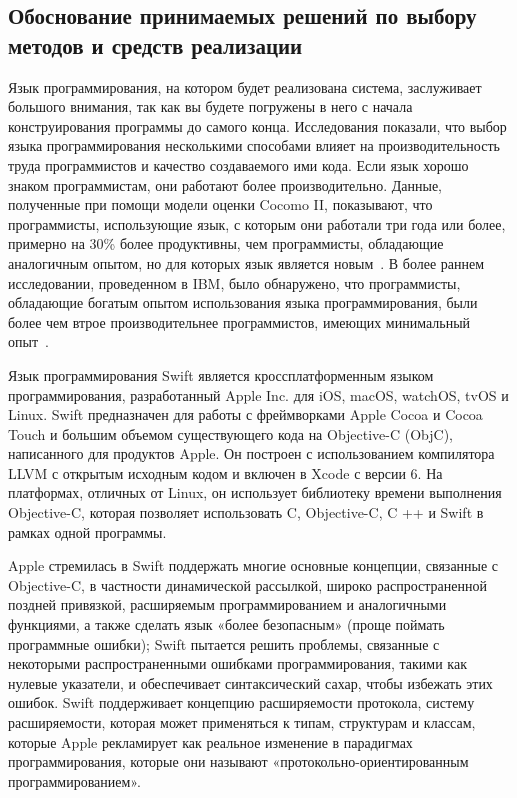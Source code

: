 \newpage
\subsection{Обоснование принимаемых решений по выбору методов и средств реализации}
\label{sec:analysis:functionalModel}

Язык программирования, на котором будет реализована система, заслуживает большого внимания, так как вы будете погружены в него с начала конструирования программы до самого конца. Исследования показали, что выбор языка программирования несколькими способами влияет на производительность труда программистов и качество создаваемого ими кода. Если язык хорошо знаком программистам, они работают более производительно. Данные, полученные при помощи модели оценки Cocomo II, показывают, что программисты, использующие язык, с которым они работали три года или более, примерно на 30\% более продуктивны, чем программисты, обладающие аналогичным опытом, но для которых язык является новым~\cite{software_cost_estimation}. В более раннем исследовании, проведенном в IBM, было обнаружено, что программисты, обладающие богатым опытом использования языка программирования, были более чем втрое производительнее программистов, имеющих минимальный опыт~\cite{method_of_programming_measurement_and_estimation}.

Язык программирования Swift является кроссплатформенным языком программирования, разработанный Apple Inc. для iOS, macOS, watchOS, tvOS и Linux. Swift предназначен для работы с фреймворками Apple Cocoa и Cocoa Touch и большим объемом существующего кода на  Objective-C (ObjC), написанного для продуктов Apple. Он построен с использованием компилятора LLVM с открытым исходным кодом и включен в Xcode с версии 6. На платформах, отличных от Linux, он использует библиотеку времени выполнения Objective-C, которая позволяет использовать C, Objective-C, C ++ и Swift в рамках одной программы.

Apple стремилась в Swift поддержать многие основные концепции, связанные с Objective-C, в частности динамической рассылкой, широко распространенной поздней привязкой, расширяемым программированием и аналогичными функциями, а также сделать язык «более безопасным» (проще поймать программные ошибки); Swift пытается решить проблемы, связанные с некоторыми распространенными ошибками программирования, такими как нулевые указатели, и обеспечивает синтаксический сахар, чтобы избежать этих ошибок. Swift поддерживает концепцию расширяемости протокола, систему расширяемости, которая может применяться к типам, структурам и классам, которые Apple рекламирует как реальное изменение в парадигмах программирования, которые они называют «протокольно-ориентированным программированием».

